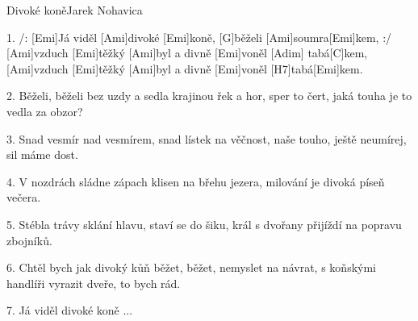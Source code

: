 \begin{song}{Divoké koně}{Jarek Nohavica}

\begin{xverse}{1. }
/: [Emi]Já viděl [Ami]divoké [Emi]koně, [G]běželi [Ami]soumra[Emi]kem, :/
[Ami]vzduch [Emi]těžký [Ami]byl a divně [Emi]voněl [Adim]{\,\,}tabá[C]kem,
[Ami]vzduch [Emi]těžký [Ami]byl a divně [Emi]voněl [H7]tabá[Emi]kem.
\end{xverse}

\begin{xverse}{2. }
Běželi, běželi bez uzdy a sedla krajinou řek a hor,
sper to čert, jaká touha je to vedla za obzor?
\end{xverse}

\begin{xverse}{3. }
Snad vesmír nad vesmírem, snad lístek na věčnost,
naše touho, ještě neumírej, sil máme dost.
\end{xverse}

\begin{xverse}{4. }
V nozdrách sládne zápach klisen na břehu jezera,
milování je divoká píseň večera.
\end{xverse}

\begin{xverse}{5. }
Stébla trávy sklání hlavu, staví se do šiku,
král s dvořany přijíždí na popravu zbojníků.
\end{xverse}

\begin{xverse}{6. }
Chtěl bych jak divoký kůň běžet, běžet, nemyslet na návrat,
s koňskými handlíři vyrazit dveře, to bych rád.
\end{xverse}

\begin{xverse}{7. }
Já viděl divoké koně ...
\end{xverse}

\end{song}
\chords{\chordAdim}

